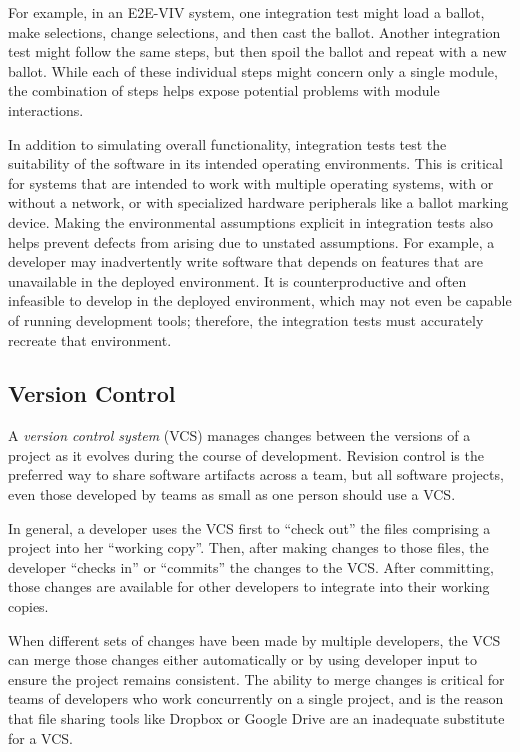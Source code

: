 For example, in an E2E-VIV system, one integration test might load a
ballot, make selections, change selections, and then cast the
ballot. Another integration test might follow the same steps, but then
spoil the ballot and repeat with a new ballot. While each of these
individual steps might concern only a single module, the combination
of steps helps expose potential problems with module interactions.

In addition to simulating overall functionality, integration tests
test the suitability of the software in its intended operating
environments. This is critical for systems that are intended to work
with multiple operating systems, with or without a network, or with
specialized hardware peripherals like a ballot marking device. Making
the environmental assumptions explicit in integration tests also helps
prevent defects from arising due to unstated assumptions. For example,
a developer may inadvertently write software that depends on features
that are unavailable in the deployed environment. It is
counterproductive and often infeasible to develop in the deployed
environment, which may not even be capable of running development
tools; therefore, the integration tests must accurately recreate that
environment.

\subsection{Version Control}

A \emph{version control system} (VCS) manages changes between the
versions of a project as it evolves during the course of
development. Revision control is the preferred way to share software
artifacts across a team, but all software projects, even those
developed by teams as small as one person should use a VCS.

In general, a developer uses the VCS first to ``check out'' the files
comprising a project into her ``working copy''. Then, after making
changes to those files, the developer ``checks in'' or ``commits'' the
changes to the VCS. After committing, those changes are available for
other developers to integrate into their working copies.

When different sets of changes have been made by multiple developers,
the VCS can merge those changes either automatically or by using
developer input to ensure the project remains consistent. The ability
to merge changes is critical for teams of developers who work
concurrently on a single project, and is the reason that file sharing
tools like Dropbox or Google Drive are an inadequate substitute for a
VCS.

